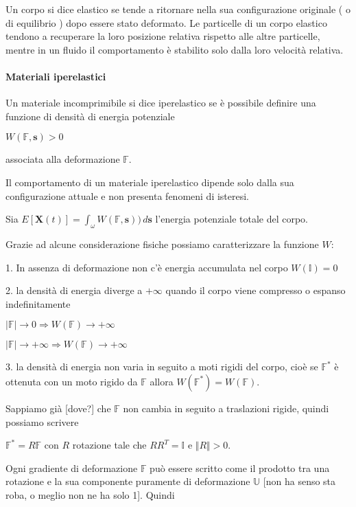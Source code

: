 \documentclass{book}
\begin{document}
Un corpo si dice elastico se tende a ritornare nella sua configurazione originale ( o di equilibrio ) dopo essere stato deformato. Le particelle di un corpo elastico tendono a recuperare la loro posizione relativa rispetto alle altre particelle, mentre in un fluido il comportamento è stabilito solo dalla loro velocità relativa.

\paragraph{Materiali iperelastici}

Un materiale incomprimibile si dice iperelastico se è possibile definire una funzione di densità di energia potenziale

$W( \mathbb{F},\mathbf{s}) > 0$

associata alla deformazione $\mathbb{F}$.

Il comportamento di un materiale iperelastico dipende solo dalla sua configurazione attuale e non presenta fenomeni di isteresi.

Sia $E [  \mathbf{X}(t) ] = \int_{\omega} W( \mathbb{F}, \mathbf{s} )) \, d\mathbf{s}$ l'energia potenziale totale del corpo.

Grazie ad alcune considerazione fisiche possiamo caratterizzare la funzione $W$:

1. In assenza di deformazione non c'è energia accumulata nel corpo $W(\mathbb{I}) = 0$

2. la densità di energia diverge a $+\infty$ quando il corpo viene compresso o espanso indefinitamente  

$\vert \mathbb{F} \vert \rightarrow 0 \Rightarrow W(\mathbb{F}) \rightarrow +\infty$

$\vert \mathbb{F} \vert \rightarrow +\infty \Rightarrow W(\mathbb{F}) \rightarrow +\infty$

3.  la densità di energia non varia in seguito a moti rigidi del corpo, cioè se $\mathbb{F}^*$ è ottenuta con un moto rigido da $\mathbb{F}$ allora $W(\mathbb{F}^*) = W(\mathbb{F})$.

Sappiamo già [dove?] che $\mathbb{F}$ non cambia in seguito a traslazioni rigide, quindi possiamo scrivere

$\mathbb{F}^* = R\mathbb{F}$ con $R$ rotazione tale che $RR^T = \mathbb{I}$ e $\Vert R \Vert > 0$.

Ogni gradiente di deformazione $\mathbb{F}$ può essere scritto come il prodotto tra una rotazione e la sua componente puramente di deformazione $\mathbb{U}$ [non ha senso sta roba, o meglio non ne ha solo 1]. Quindi
\end{document}
